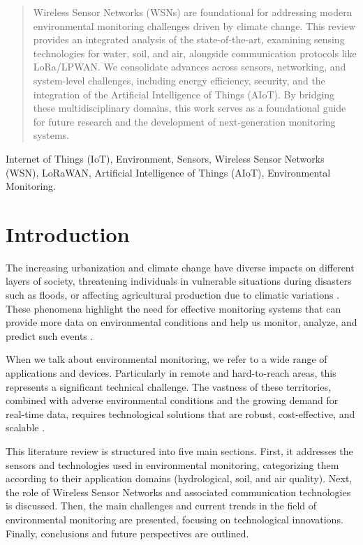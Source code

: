 \documentclass[conference]{IEEEtran}
\begin{document}
\begin{abstract}
Wireless Sensor Networks (WSNs) are foundational for addressing modern environmental monitoring challenges driven by climate change. This review provides an integrated analysis of the state-of-the-art, examining sensing technologies for water, soil, and air, alongside communication protocols like LoRa/LPWAN. We consolidate advances across sensors, networking, and system-level challenges, including energy efficiency, security, and the integration of the Artificial Intelligence of Things (AIoT). By bridging these multidisciplinary domains, this work serves as a foundational guide for future research and the development of next-generation monitoring systems.
\end{abstract}

\begin{IEEEkeywords}
Internet of Things (IoT), Environment, Sensors, Wireless Sensor Networks (WSN), LoRaWAN, Artificial Intelligence of Things (AIoT), Environmental Monitoring.
\end{IEEEkeywords}

\section{Introduction}
The increasing urbanization and climate change have diverse impacts on different layers of society, threatening individuals in vulnerable situations during disasters such as floods, or affecting agricultural production due to climatic variations \cite{jonkman_2005_global, hall_2014_understanding, bragana_2024_anlise, borga_2014_hydrogeomorphic}. These phenomena highlight the need for effective monitoring systems that can provide more data on environmental conditions and help us monitor, analyze, and predict such events \cite{hall_2014_understanding, lin_2020_semantic, lo_2015_visual, iqbal_2021_how}.

When we talk about environmental monitoring, we refer to a wide range of applications and devices. Particularly in remote and hard-to-reach areas, this represents a significant technical challenge. The vastness of these territories, combined with adverse environmental conditions and the growing demand for real-time data, requires technological solutions that are robust, cost-effective, and scalable \cite{chen_2013_natural, yellampalli_2021_wireless, pule_2017_wireless}.

This literature review is structured into five main sections. First, it addresses the sensors and technologies used in environmental monitoring, categorizing them according to their application domains (hydrological, soil, and air quality). Next, the role of Wireless Sensor Networks and associated communication technologies is discussed. Then, the main challenges and current trends in the field of environmental monitoring are presented, focusing on technological innovations. Finally, conclusions and future perspectives are outlined.
\end{document}
